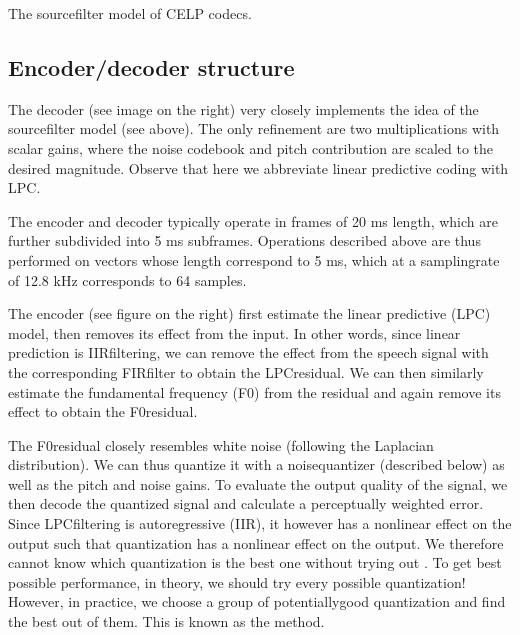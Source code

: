 \documentclass[letterpaper,10pt,english]{jupyterBook}
\begin{document}
\sphinxAtStartPar
{}
The source\sphinxhyphen{}filter model of CELP codecs.


\subsection{Encoder/decoder structure}
\label{\detokenize{Transmission/Code-excited_linear_prediction_CELP:encoder-decoder-structure}}
\sphinxAtStartPar
The decoder (see image on the right) very closely implements the idea of
the source\sphinxhyphen{}filter model (see above). The only refinement are two
multiplications with scalar gains, where the noise codebook and pitch
contribution are scaled to the desired magnitude. Observe that here we
abbreviate linear predictive coding with LPC.

\sphinxAtStartPar
The encoder and decoder typically operate in frames of 20 ms length,
which are further subdivided into 5 ms subframes. Operations described
above are thus performed on vectors whose length correspond to 5 ms,
which at a sampling\sphinxhyphen{}rate of 12.8 kHz corresponds to 64 samples.

\sphinxAtStartPar
The encoder (see figure on the right) first estimate the linear
predictive (LPC) model, then removes its effect from the input. In other
words, since linear prediction is IIR\sphinxhyphen{}filtering, we can remove the
effect from the speech signal with the corresponding FIR\sphinxhyphen{}filter to
obtain the LPC\sphinxhyphen{}residual. We can then similarly estimate the fundamental
frequency (F0) from the residual and again remove its effect to obtain
the F0\sphinxhyphen{}residual.

\sphinxAtStartPar
The F0\sphinxhyphen{}residual closely resembles white noise (following the Laplacian
distribution). We can thus quantize it with a noise\sphinxhyphen{}quantizer (described
below) as well as the pitch and noise gains. To evaluate the output
quality of the signal, we then decode the quantized signal and calculate
a perceptually weighted error. Since LPC\sphinxhyphen{}filtering is autoregressive
(IIR), it however has a non\sphinxhyphen{}linear effect on the output such that
quantization has a non\sphinxhyphen{}linear effect on the output. We therefore cannot
know which quantization is the best one without trying out . To get best possible performance, in theory, we should try every
possible quantization! However, in practice, we choose a group of
potentially\sphinxhyphen{}good quantization and find the best out of them. This is
known as the  method.
\end{document}
